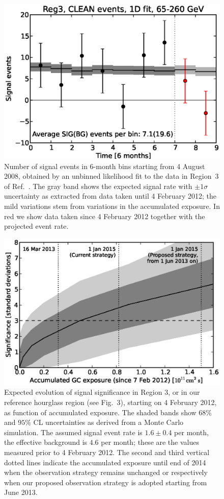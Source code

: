\documentclass[aps,prd,superscriptaddress,showpacs,nofootinbib,fixlfloat, 12pt]{revtex4-1}
\begin{document}
\begin{figure}[h]
  \begin{center}
    \includegraphics[width=0.60\linewidth]{plots/semester_fluxes.eps}
    \vspace{-0.5cm}
  \end{center}
  \caption{Number of signal events in 6-month bins starting from 4
    August 2008, obtained by an unbinned likelihood fit to the data in
    Region~3 of Ref.~\cite{Weniger:2012}. The gray band shows the expected
    signal rate with $\pm1\sigma$ uncertainty as extracted from data taken until
    4 February 2012; the mild variations stem from variations in the
    accumulated exposure. In red we show data taken since 4 February 2012
    together with the projected event rate.}
  \label{fig:semester_fluxes}
\end{figure}


\begin{figure}[h]
  \begin{center}
    \includegraphics[width=0.6\linewidth]{plots/projection.eps}
    \vspace{-0.5cm}
  \end{center}
  \caption{
    Expected evolution of signal significance in Region 3, or in our reference
    hourglass region (see Fig.~3), starting on 4 February 2012, as function of
    accumulated exposure.  The shaded bands show $68\%$ and $95\%$ CL
    uncertainties as derived from a Monte Carlo simulation.  The assumed
    signal event rate is $1.6\pm 0.4$ per month, the effective background is
    $4.6$ per month; these are the values measured prior to 4 February 2012.
    The second and third vertical dotted lines indicate the
    accumulated exposure until end of 2014 when the observation strategy remains
    unchanged or respectively when our proposed observation strategy is
    adopted starting from June 2013.}
  \label{fig:projection}
\end{figure}
\end{document}

